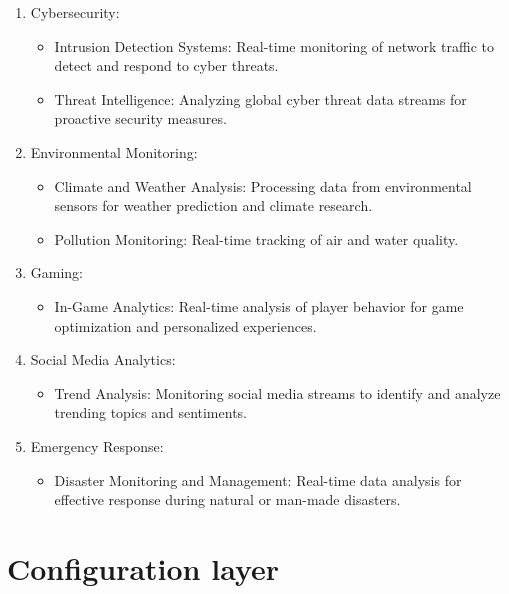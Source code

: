 \documentclass[11pt, reqno]{amsart}
\theoremstyle{definition}
\theoremstyle{remark}
\begin{document}
\begin{enumerate}
  \item Cybersecurity:
        \begin{itemize}
          \item Intrusion Detection Systems: Real-time monitoring of network traffic
                to detect and respond to cyber threats.
          \item Threat Intelligence: Analyzing global cyber threat data streams for
                proactive security measures.
        \end{itemize}

  \item Environmental Monitoring:
        \begin{itemize}
          \item Climate and Weather Analysis: Processing data from environmental
                sensors for weather prediction and climate research.
          \item Pollution Monitoring: Real-time tracking of air and water quality.
        \end{itemize}

  \item Gaming:
        \begin{itemize}
          \item In-Game Analytics: Real-time analysis of player behavior for game
                optimization and personalized experiences.
        \end{itemize}

  \item Social Media Analytics:
        \begin{itemize}
          \item Trend Analysis: Monitoring social media streams to identify and
                analyze trending topics and sentiments.
        \end{itemize}

  \item Emergency Response:
        \begin{itemize}
          \item Disaster Monitoring and Management: Real-time data analysis for
                effective response during natural or man-made disasters.
        \end{itemize}
\end{enumerate}

\section{Configuration layer}
\end{document}
